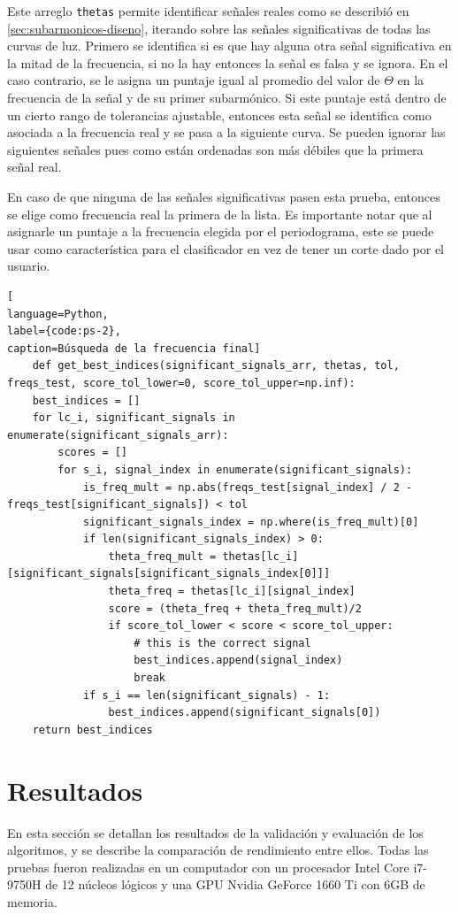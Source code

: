 Este arreglo \texttt{thetas} permite identificar señales reales como se describió en \ref{sec:subarmonicos-diseno}, iterando sobre las señales significativas de todas las curvas de luz. Primero se identifica si es que hay alguna otra señal significativa en la mitad de la frecuencia, si no la hay entonces la señal es falsa y se ignora. En el caso contrario, se le asigna un puntaje igual al promedio del valor de $\Theta$ en la frecuencia de la señal y de su primer subarmónico. Si este puntaje está dentro de un cierto rango de tolerancias ajustable, entonces esta señal se identifica como asociada a la frecuencia real y se pasa a la siguiente curva. Se pueden ignorar las siguientes señales pues como están ordenadas son más débiles que la primera señal real.

En caso de que ninguna de las señales significativas pasen esta prueba, entonces se elige como frecuencia real la primera de la lista. Es importante notar que al asignarle un puntaje a la frecuencia elegida por el periodograma, este se puede usar como característica para el clasificador en vez de tener un corte dado por el usuario.
\begin{lstlisting}[
language=Python,
label={code:ps-2},
caption=Búsqueda de la frecuencia final]
    def get_best_indices(significant_signals_arr, thetas, tol, freqs_test, score_tol_lower=0, score_tol_upper=np.inf):
    best_indices = []
    for lc_i, significant_signals in enumerate(significant_signals_arr):
        scores = []
        for s_i, signal_index in enumerate(significant_signals):
            is_freq_mult = np.abs(freqs_test[signal_index] / 2 - freqs_test[significant_signals]) < tol
            significant_signals_index = np.where(is_freq_mult)[0]
            if len(significant_signals_index) > 0:
                theta_freq_mult = thetas[lc_i][significant_signals[significant_signals_index[0]]]
                theta_freq = thetas[lc_i][signal_index]
                score = (theta_freq + theta_freq_mult)/2
                if score_tol_lower < score < score_tol_upper:
                    # this is the correct signal
                    best_indices.append(signal_index)
                    break
            if s_i == len(significant_signals) - 1:
                best_indices.append(significant_signals[0])
    return best_indices
\end{lstlisting}


\chapter{Resultados}\label{chap:resultados}
En esta sección se detallan los resultados de la validación y evaluación de los algoritmos, y se describe la comparación de rendimiento entre ellos. Todas las pruebas fueron realizadas en un computador con un procesador Intel Core i7-9750H de 12 núcleos lógicos y una GPU Nvidia GeForce 1660 Ti con 6GB de memoria.
